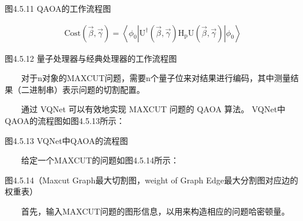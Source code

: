 \documentclass[a4paper,11pt,english]{sphinxmanual}
\let\sphinxpxdimen\pdfpxdimen\else\newdimen\sphinxpxdimen
\begin{document}
\noindent{\hspace*{\fill}\sphinxincludegraphics[width=250\sphinxpxdimen]{{4.5.11}.png}\hspace*{\fill}}

\begin{center}图4.5.11 QAOA的工作流程图
\end{center}\begin{equation*}
\begin{split}\text{Cost}(\vec{\beta}, \vec{\gamma})=\left\langle\phi_{0}\left|\mathrm{U}^{\dagger}(\vec{\beta}, \vec{\gamma}) \mathrm{H}_{\mathrm{p}} \mathrm{U}(\vec{\beta}, \vec{\gamma})\right| \phi_{0}\right\rangle\end{split}
\end{equation*}

\begin{center}图4.5.12 量子处理器与经典处理器的工作流程图
\end{center}
\sphinxAtStartPar
{}

\sphinxAtStartPar
  对于n对象的MAX\sphinxhyphen{}CUT问题，需要n个量子位来对结果进行编码，其中测量结果（二进制串）表示问题的切割配置。

\sphinxAtStartPar
  通过 VQNet 可以有效地实现 MAX\sphinxhyphen{}CUT 问题的 QAOA 算法。 VQNet中QAOA的流程图如图4.5.13所示：


\begin{center}图4.5.13 VQNet中QAOA的流程图
\end{center}
\sphinxAtStartPar
  给定一个MAX\sphinxhyphen{}CUT的问题如图4.5.14所示：



\begin{center}图4.5.14（Max\sphinxhyphen{}cut Graph\sphinxhyphen{}最大切割图，weight of Graph Edge\sphinxhyphen{}最大分割图对应边的权重表）
\end{center}
\sphinxAtStartPar
  首先，输入MAX\sphinxhyphen{}CUT问题的图形信息，以用来构造相应的问题哈密顿量。
\end{document}
